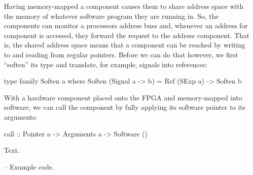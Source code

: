 \documentclass[../main.tex]{subfiles}
\begin{document}
Having memory-mapped a component causes them to share address space with the memory of whatever software program they are running in. So, the components can monitor a processors address buss and, whenever an address for component is accessed, they forward the request to the address component. That is, the shared address space means that a component can be reached by writing to and reading from regular pointers. Before we can do that however, we first ``soften'' its type and translate, for example, signals into references:


\begin{code}
type family Soften a where
  Soften (Signal a -> b) = Ref (SExp a) -> Soften b
\end{code}


With a hardware component placed onto the FPGA and memory-mapped into software, we can call the component by fully applying its software pointer to its arguments:

\begin{code}
call :: Pointer a -> Arguments a -> Software ()
\end{code}

Text.

\begin{code}
-- Example code.
\end{code}
\end{document}
